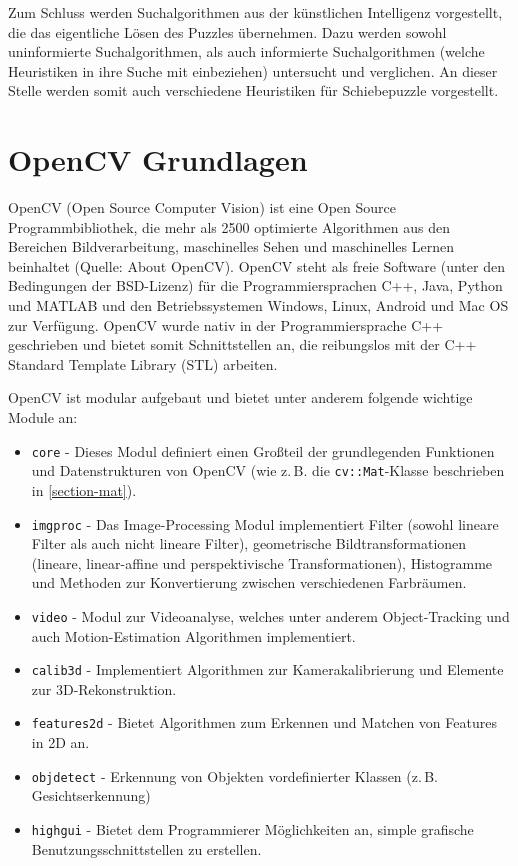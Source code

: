 \documentclass{whswinvcbook}
\begin{document}
Zum Schluss werden Suchalgorithmen aus der künstlichen Intelligenz vorgestellt, die das eigentliche Lösen des Puzzles übernehmen. Dazu werden sowohl uninformierte Suchalgorithmen, als auch informierte Suchalgorithmen (welche Heuristiken in ihre Suche mit einbeziehen) untersucht und verglichen. An dieser Stelle werden somit auch verschiedene Heuristiken für Schiebepuzzle vorgestellt.
\chapter{OpenCV Grundlagen}
OpenCV (Open Source Computer Vision) ist eine Open Source Programmbibliothek, die mehr als 2500 optimierte Algorithmen aus den Bereichen Bildverarbeitung, maschinelles Sehen und maschinelles Lernen beinhaltet (Quelle: About OpenCV\cite{opencv}). OpenCV steht als freie Software (unter den Bedingungen der BSD-Lizenz) für die Programmiersprachen C++, Java, Python und MATLAB und den Betriebssystemen Windows, Linux, Android und Mac OS zur Verfügung. OpenCV wurde nativ in der Programmiersprache C++ geschrieben und bietet somit Schnittstellen an, die reibungslos mit der C++ Standard Template Library (STL) arbeiten.

OpenCV ist modular aufgebaut und bietet unter anderem folgende wichtige Module an:\cite{opencv3}
\begin{itemize}
    \item \texttt{core} - Dieses Modul definiert einen Großteil der grundlegenden Funktionen und Datenstrukturen von OpenCV (wie z.\,B. die \texttt{cv::Mat}-Klasse beschrieben in \ref{section-mat}).
    \item \texttt{imgproc} - Das Image-Processing Modul implementiert Filter (sowohl lineare Filter als auch nicht lineare Filter), geometrische Bildtransformationen (lineare, linear-affine und perspektivische Transformationen), Histogramme und Methoden zur Konvertierung zwischen verschiedenen Farbräumen.
    \item \texttt{video} - Modul zur Videoanalyse, welches unter anderem Object-Tracking und auch Motion-Estimation Algorithmen implementiert.
    \item \texttt{calib3d} - Implementiert Algorithmen zur Kamerakalibrierung und Elemente zur 3D-Rekonstruktion.
    \item \texttt{features2d} - Bietet Algorithmen zum Erkennen und Matchen von Features in 2D an.
    \item \texttt{objdetect} - Erkennung von Objekten vordefinierter Klassen (z.\,B. Gesichtserkennung)
    \item \texttt{highgui} - Bietet dem Programmierer Möglichkeiten an, simple grafische Benutzungsschnittstellen zu erstellen.
\end{itemize}
\end{document}
